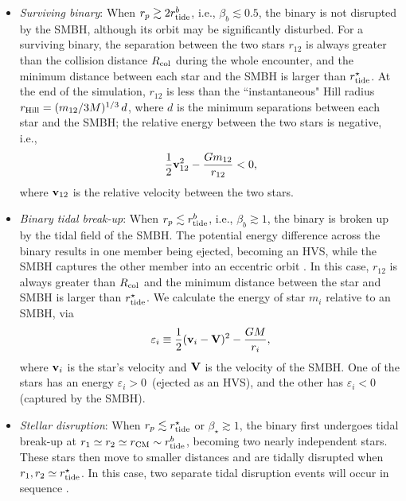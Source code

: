 \documentclass[twocolumn]{aastex631}
\begin{document}
\begin{itemize}
    \item {\it Surviving binary}: 
    When $r_p \gtrsim 2 r_{\rm tide}^b$, i.e., $\beta_b \lesssim 0.5$, the binary is not disrupted by the SMBH, although its orbit may be significantly disturbed.
    For a surviving binary, the separation between the two stars $r_{12}$ is always greater than the collision distance $R_{\rm col}$ during the whole encounter, 
    and the minimum distance between each star and the SMBH is larger than $r_{\rm tide}^\star$.
    At the end of the simulation, $r_{12}$ is less than the ``instantaneous" Hill radius $r_{\rm Hill}=(m_{\rm 12}/3M)^{1/3}\,d$, where $d$ is the minimum separations between each star and the SMBH; 
    the relative energy between the two stars is negative, i.e.,
    \begin{equation}
        \frac{1}{2}{\bf v}_{12}^2-\frac{Gm_{12}}{r_{12}}<0,
        \label{Eq:inertial}
    \end{equation}
    where ${\bf v}_{12}$ is the relative velocity between the two stars.

    \item {\it Binary tidal break-up}: 
    When $r_p \lesssim r_{\rm tide}^b$, i.e., $\beta_b \gtrsim 1$, the binary is broken up by the tidal field of the SMBH.
    The potential energy difference across the binary results in one member being ejected, becoming an HVS, while the SMBH captures the other member into an eccentric orbit \citep{Hills1988Nature}.
    In this case, $r_{12}$ is always greater than $R_{\rm col}$ and the minimum distance between the star and SMBH is larger than $r_{\rm tide}^\star$.
    We calculate the energy of star $m_i$ relative to an SMBH, via
    \begin{equation}
        \varepsilon_i\equiv \frac{1}{2} ({\bf v}_i-{\bf V})^2-\frac{GM}{r_i},
        \label{Eq:energy}
    \end{equation}
    where ${\bf v}_i$ is the star's velocity and ${\bf V}$ is the velocity of the SMBH.
    One of the stars has an energy $\varepsilon_i>0\,$ (ejected as an HVS), and the other has $\varepsilon_i<0$ (captured by the SMBH).
    
    \item {\it Stellar disruption}:
    When $r_p \lesssim r_{\rm tide}^\star$ or $\beta_\star \gtrsim 1$, the binary first undergoes tidal break-up at $r_1\simeq r_2\simeq r_{\rm CM} \sim r_{\rm tide}^b$, becoming two nearly independent stars. 
    These stars then move to smaller distances and are tidally disrupted when $r_1, r_2\simeq r_{\rm tide}^\star$.
    In this case, two separate tidal disruption events will occur in sequence \citep{Mandel2015ApJL}.
    

\end{itemize}
\end{document}
